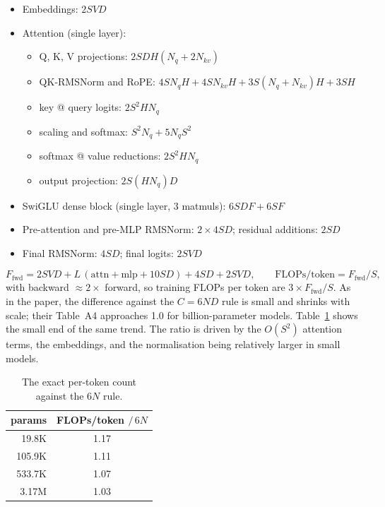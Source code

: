 \documentclass[10pt]{article}
\begin{document}
\begin{itemize}
  \item Embeddings: $2SVD$
  \item Attention (single layer):
  \begin{itemize}
    \item Q, K, V projections: $2SDH(N_q + 2N_{kv})$
    \item QK-RMSNorm and RoPE: $4SN_qH + 4SN_{kv}H + 3S(N_q{+}N_{kv})H + 3SH$
    \item key @ query logits: $2S^2 H N_q$
    \item scaling and softmax: $S^2 N_q + 5 N_q S^2$
    \item softmax @ value reductions: $2S^2 H N_q$
    \item output projection: $2S(HN_q)D$
  \end{itemize}
  \item SwiGLU dense block (single layer, 3 matmuls): $6SDF + 6SF$
  \item Pre-attention and pre-MLP RMSNorm: $2 \times 4SD$; residual additions: $2SD$
  \item Final RMSNorm: $4SD$; final logits: $2SVD$
\end{itemize}
\begin{equation}
  F_{\mathrm{fwd}} = 2SVD + L\,(\mathrm{attn} + \mathrm{mlp} + 10SD) + 4SD + 2SVD,
  \qquad
  \text{FLOPs/token} = F_{\mathrm{fwd}} / S,
\end{equation}
with backward $\approx 2\times$ forward, so training FLOPs per token are
$3 \times F_{\mathrm{fwd}}/S$. As in the paper, the difference against the
$C = 6ND$ rule is small and shrinks with scale; their Table~A4 approaches
1.0 for billion-parameter models. Table~\ref{tab:flops} shows the small
end of the same trend. The ratio is driven by the $O(S^2)$ attention terms,
the embeddings, and the normalisation being relatively larger in small
models.

\begin{table}[h]
\centering
\small
\begin{tabular}{rc}
\toprule
params & FLOPs/token $/\, 6N$ \\
\midrule
19.8K  & 1.17 \\
105.9K & 1.11 \\
533.7K & 1.07 \\
3.17M  & 1.03 \\
\bottomrule
\end{tabular}
\caption{The exact per-token count against the $6N$ rule.}
\label{tab:flops}
\end{table}
\end{document}
